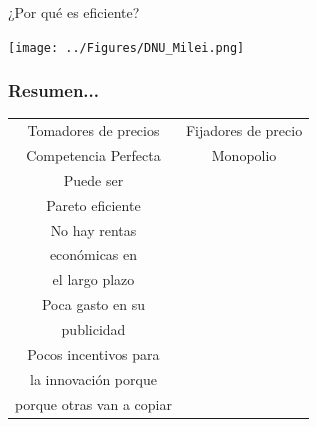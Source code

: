 \documentclass{beamer}
\begin{document}
\begin{frame}{¿Por qué es eficiente?}
    \begin{center}
        \texttt{[image: ../Figures/DNU\_Milei.png]}
    \end{center}
\end{frame}

\begin{frame}
\frametitle{Resumen...}
\small
\begin{center}
    \begin{tabular}{c|c}
    \hline
    \hline
    Tomadores de precios & Fijadores de precio \\
    Competencia Perfecta & Monopolio
    \\
    \hline
    \hline
    Puede ser   &  \\ 
    Pareto eficiente & 
    \\
    \hline
    No hay rentas &  \\
    económicas en &  \\
    el largo plazo & 
    \\
    \hline
    Poca gasto en su &  \\ publicidad & 
    \\
    \hline
    Pocos incentivos para &   \\ 
    la innovación porque &  \\
    porque otras van a copiar & 
\end{tabular}
\end{center}
\end{frame}
\end{document}

